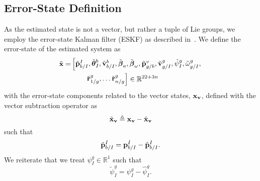 

\subsection{Error-State Definition}

As the estimated state is not a vector, but rather a tuple of Lie groups, we
employ the error-state Kalman filter (ESKF) as described in~\cite{koch2017relative}.
We define the error-state of the estimated system as
\begin{align}
  \tilde{\boldsymbol{\mathrm{x}}} =&
  \left[ \begin{matrix}
    \tilde{\boldsymbol{\mathrm{p}}}_{b/I}^{I}, \tilde{\boldsymbol{\mathrm{\theta}}}_I^{b}, \tilde{\boldsymbol{\mathrm{v}}}_{b/I}^b,
    \tilde{\boldsymbol{\mathrm{\beta}}}_a,
    \tilde{\boldsymbol{\mathrm{\beta}}}_{\omega},
    \tilde{\boldsymbol{\mathrm{p}}}_{g/b}^{v}, \tilde{\boldsymbol{\mathrm{v}}}_{g/I}^{g}, \tilde{\psi}_{I}^{g},
\tilde{\omega}_{g/I}^{g}, \end{matrix} \right. \\
& \qquad \left. \begin{matrix}
      \tilde{\boldsymbol{\mathrm{r}}}_{1/g}^{g}, \dots \tilde{\boldsymbol{\mathrm{r}}}_{n/g}^{g}
  \end{matrix} \right]
  \in \mathbb{R}^{22 + 3n} \nonumber
\end{align}
with the error-state components related to the vector states, $\boldsymbol{\mathrm{x}}_{\boldsymbol{\mathrm{v}}}$, defined with
the vector subtraction operator as
\begin{equation}
\tilde{\x}_{\vect{v}} \triangleq \x_{\vect{v}} - \hat{\x}_{\vect{v}}
\label{eq:est_paper_vector_error_state}
\end{equation}
such that
\begin{equation}
  \tilde{\vect{p}}_{b/I}^I = \vect{p}_{b/I}^I - \hat{\vect{p}}_{b/I}^I.
  \label{eq:est_paper_uav_pos_err_state}
\end{equation}
We reiterate that we treat $\psi_I^g \in \mathbb{R}^1$
such that
\begin{equation}
  \tilde{\psi}_I^g = \psi_I^g - \hat{\psi}_I^g.
  \label{eq:2d_att_err_state}
\end{equation}

